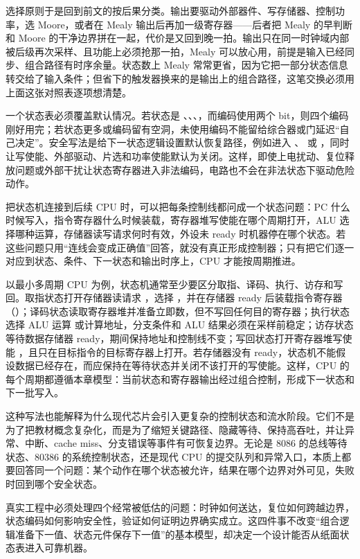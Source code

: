 选择原则于是回到前文的按后果分类。输出要驱动外部器件、写存储器、控制功率，选 Moore，或者在 Mealy 输出后再加一级寄存器——后者把 Mealy 的早判断和 Moore 的干净边界拼在一起，代价是又回到晚一拍。输出只在同一时钟域内部被后级再次采样、且功能上必须抢那一拍，Mealy 可以放心用，前提是输入已经同步、组合路径有时序余量。状态数上 Mealy 常常更省，因为它把一部分状态信息转交给了输入条件；但省下的触发器换来的是输出上的组合路径，这笔交换必须用上面这张对照表逐项想清楚。

一个状态表必须覆盖默认情况。若状态是 、、、，而编码使用两个 bit，则四个编码刚好用完；若状态更多或编码留有空洞，未使用编码不能留给综合器或门延迟“自己决定”。安全写法是给下一状态逻辑设置默认恢复路径，例如进入 、 或 ，同时让写使能、外部驱动、片选和功率使能默认为关闭。这样，即使上电扰动、复位释放问题或外部干扰让状态寄存器进入非法编码，电路也不会在非法状态下驱动危险动作。

把状态机连接到后续 CPU 时，可以把每条控制线都问成一个状态问题：PC 什么时候写入，指令寄存器什么时候装载，寄存器堆写使能在哪个周期打开，ALU 选择哪种运算，存储器读写请求何时有效，外设未 ready 时机器停在哪个状态。若这些问题只用“连线会变成正确值”回答，就没有真正形成控制器；只有把它们逐一对应到状态、条件、下一状态和输出时序上，CPU 才能按周期推进。

以最小多周期 CPU 为例，状态机通常至少要区分取指、译码、执行、访存和写回。取指状态打开存储器读请求 ，选择 ，并在存储器 ready 后装载指令寄存器（）；译码状态读取寄存器堆并准备立即数，但不写回任何目的寄存器；执行状态选择 ALU 运算  或计算地址，分支条件和 ALU 结果必须在采样前稳定；访存状态等待数据存储器 ready，期间保持地址和控制线不变；写回状态打开寄存器堆写使能 ，且只在目标指令的目标寄存器上打开。若存储器没有 ready，状态机不能假设数据已经存在，而应保持在等待状态并关闭不该打开的写使能。这样，CPU 的每个周期都遵循本章模型：当前状态和寄存器输出经过组合控制，形成下一状态和下一批写入。

这种写法也能解释为什么现代芯片会引入更复杂的控制状态和流水阶段。它们不是为了把教材概念复杂化，而是为了缩短关键路径、隐藏等待、保持高吞吐，并让异常、中断、cache miss、分支错误等事件有可恢复边界。无论是 8086 的总线等待状态、80386 的系统控制状态，还是现代 CPU 的提交队列和异常入口，本质上都要回答同一个问题：某个动作在哪个状态被允许，结果在哪个边界对外可见，失败时回到哪个安全状态。


真实工程中必须处理四个经常被低估的问题：时钟如何送达，复位如何跨越边界，状态编码如何影响安全性，验证如何证明边界确实成立。这四件事不改变“组合逻辑准备下一值、状态元件保存下一值”的基本模型，却决定一个设计能否从纸面状态表进入可靠机器。

